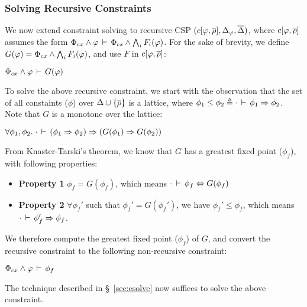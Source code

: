 \subsubsection{Solving Recursive Constraints}

We now extend constraint solving to recursive CSP $(c\lbrack \varphi,\overline{\rho} \rbrack,\Delta_{\varphi},\overline{\Delta})$, where
$c\lbrack \varphi,\overline{\rho} \rbrack$ assumes the form $\Phi_{cx}
\wedge \varphi\,\vdash\,\Phi_{cs} \wedge \bigwedge_i F_i(\varphi)$. For the sake
of brevity, we define $G(\varphi) = \Phi_{cx} \wedge \bigwedge_i
F_i(\varphi)$, and use $F$ in $c\lbrack \varphi,\overline{\rho} \rbrack$: 
\begin{center}
\(
  \Phi_{cx} \wedge \varphi\,\vdash\,G(\varphi)
\)
\end{center}
To solve the above recursive constraint, we start with the observation
that the set of all constaints ($\phi$) over $\Delta \cup
\{\overline{\rho}\}$ is a lattice, where $\phi_1 \le \phi_2 \triangleq
\cdot\,\vdash\,\phi_1 \Rightarrow \phi_2$. Note that $G$ is a
monotone over the lattice:
\begin{center}
  $\forall \phi_1,\phi_2.\; \cdot\,\vdash\,(\phi_1 \Rightarrow
  \phi_2) \Rightarrow (G(\phi_1) \Rightarrow G(\phi_2))$
\end{center}
From Knaster-Tarski's theorem, we know that $G$ has a greatest fixed
point ($\phi_f$), with following properties:
\begin{itemize}
\item \textbf{Property 1} $\phi_f = G(\phi_f)$, which means
$\cdot\,\vdash\,\phi_f \Leftrightarrow G(\phi_f)$
\item \textbf{Property 2} $\forall \phi_f'$ such that $\phi_f' =
G(\phi_f')$, we have $\phi_f' \le \phi_f$, which means $\cdot\,\vdash\,\phi_f' \Rightarrow \phi_f$.
\end{itemize}
We therefore compute the greatest fixed point ($\phi_f$) of $G$, and
convert the recursive constraint to the following non-recursive
constraint:
\begin{center}
\(
  \Phi_{cx} \wedge \varphi\,\vdash\,\phi_f
\)
\end{center}
The technique described in \S~\ref{sec:csolve} now suffices to solve
the above constraint.


